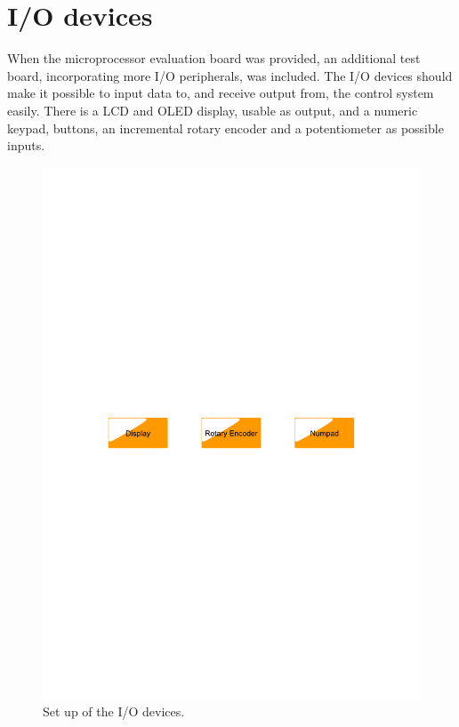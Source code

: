 \section{I/O devices}\label{sec:iodevices}
When the microprocessor evaluation board was provided, an additional test board, incorporating more I/O peripherals, was included. The I/O devices should make it possible to input data to, and receive output from, the control system easily. There is a LCD and OLED display, usable as output, and a numeric keypad, buttons, an incremental rotary encoder and a potentiometer as possible inputs.
\begin{figure}[htb]
	\centering
	\includegraphics[scale=0.6,clip,trim=00 400 00 400]{graphics/iodevices} %
	\caption{Set up of the I/O devices.}
	\label{fig:iodevices}			%
\end{figure}



